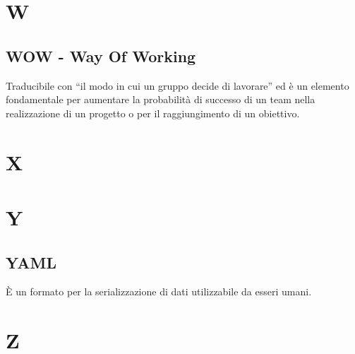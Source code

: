 \documentclass{classes/base}
\begin{document}
        \newpage  
    \section{W}
        \subsection*{WOW - Way Of Working}
        Traducibile con “il modo in cui un gruppo decide di lavorare” ed è un elemento fondamentale per aumentare la probabilità di successo di un team nella realizzazione di un progetto o per il raggiungimento di un obiettivo.  
        \newpage  
    \section{X}
    \newpage  
    \section{Y}
        \subsection*{YAML}
        È un formato per la serializzazione di dati utilizzabile da esseri umani.
        
        \newpage  
    \section{Z}
\end{document}
